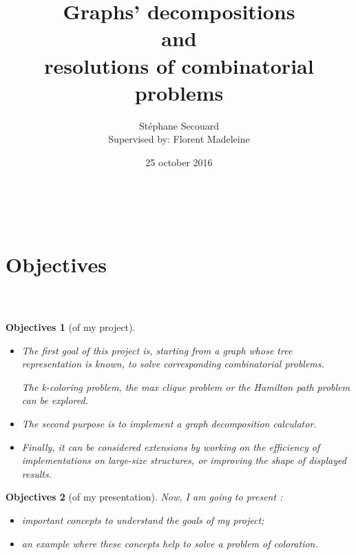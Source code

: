 \documentclass[8pt]{beamer}
\title[Graphs' decompositions\\ and \\ resolutions of combinatorial problems]{Graphs' decompositions\\ and \\ resolutions of combinatorial problems}
\author[Stéphane Secouard]{\small {Stéphane Secouard\\ \footnotesize Supervised by: Florent Madeleine}}
\institute[Caen University]{\textbf {Caen University - Computer science }}
\date{25 october 2016}
\newtheorem*{obj}{Objectives}
\begin{document}
\begin{frame}

  \titlepage
\end{frame}


\begin{frame}

  \frametitle{ \textcolor{white}{Table of contents}}

  \tableofcontents

\end{frame}







\section{Objectives}

\begin{frame}
  \frametitle{ \textcolor{white}{Objectives}}

  \begin{obj}[of my project]
  \begin{itemize}
  \item The first goal of this project is, starting from a graph whose  tree representation is known, to solve corresponding combinatorial problems.

    The k-coloring problem, the max clique problem or the Hamilton path problem can be explored.

\item The second purpose is to implement a graph decomposition calculator.

\item Finally, it can be considered extensions by working on the efficiency of implementations on large-size structures, or improving the shape of displayed results.
  \end{itemize}
  \end{obj}

  \begin{obj}[of my presentation]
    Now, I am going to present :
    \begin{itemize}
    \item important concepts to understand the goals of my project;
    \item an example where these concepts help to solve a problem of coloration.
    \end{itemize}
    \end{obj}
\end{frame}
\end{document}
